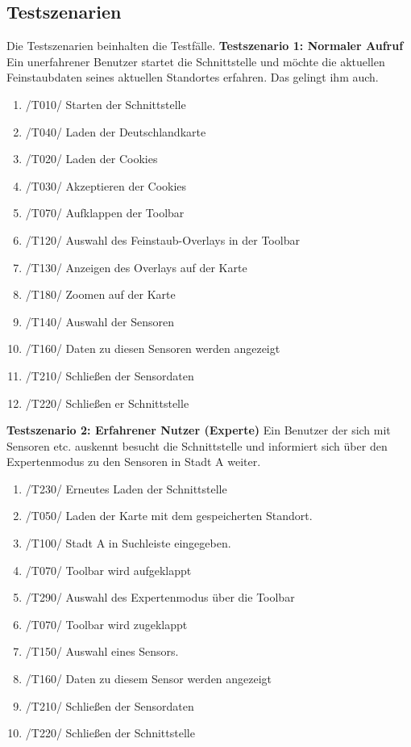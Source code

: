 \subsection{Testszenarien}
Die Testszenarien beinhalten die Testfälle. 
\textbf{Testszenario 1: Normaler Aufruf}
\newline
Ein unerfahrener Benutzer startet die Schnittstelle und möchte die aktuellen Feinstaubdaten seines aktuellen Standortes erfahren. Das gelingt ihm auch.
\begin{enumerate} [noitemsep]
    \item /T010/ Starten der Schnittstelle
    \item /T040/ Laden der Deutschlandkarte
    \item /T020/ Laden der Cookies
    \item /T030/ Akzeptieren der Cookies
    \item /T070/ Aufklappen der Toolbar
    \item /T120/ Auswahl des Feinstaub-Overlays in der Toolbar
    \item /T130/ Anzeigen des Overlays auf der Karte
    \item /T180/ Zoomen auf der Karte
    \item /T140/ Auswahl der Sensoren
    \item /T160/ Daten zu diesen Sensoren werden angezeigt
    \item /T210/ Schließen der Sensordaten
    \item /T220/ Schließen er Schnittstelle
\end{enumerate}

\textbf{Testszenario 2: Erfahrener Nutzer (Experte)}
\newline
Ein Benutzer der sich mit Sensoren etc. auskennt besucht die Schnittstelle und informiert sich über den Expertenmodus zu den Sensoren in Stadt A weiter.
\begin{enumerate} [noitemsep]
    \item /T230/ Erneutes Laden der Schnittstelle
    \item /T050/ Laden der Karte mit dem gespeicherten Standort.
    \item /T100/ Stadt A in Suchleiste eingegeben.
    \item /T070/ Toolbar wird aufgeklappt
    \item /T290/ Auswahl des Expertenmodus über die Toolbar
    \item /T070/ Toolbar wird zugeklappt
    \item /T150/ Auswahl eines Sensors.
    \item /T160/ Daten zu diesem Sensor werden angezeigt
    \item /T210/ Schließen der Sensordaten
    \item /T220/ Schließen der Schnittstelle
\end{enumerate}

